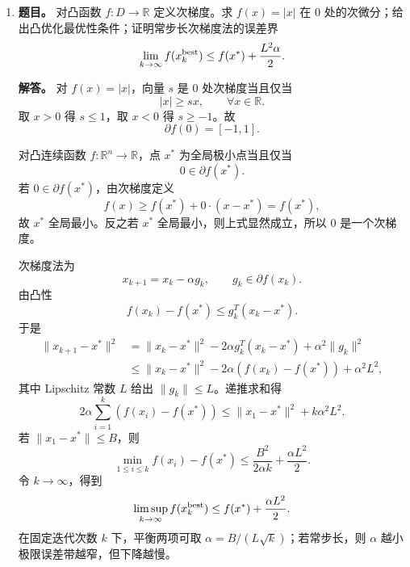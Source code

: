 ﻿\documentclass[UTF8,12pt]{ctexart}
\begin{document}
\begin{enumerate}[label=\textbf{\arabic*.},leftmargin=2.2em]
\item \textbf{题目。} 对凸函数 \(f:D\to\mathbb R\) 定义次梯度。求 \(f(x)=|x|\) 在 \(0\) 处的次微分；给出凸优化最优性条件；证明常步长次梯度法的误差界
\[
\lim_{k\to\infty} f(x_k^{\rm best})\le f(x^\ast)+\frac{L^2\alpha}{2}.
\]

\textbf{解答。} 对 \(f(x)=|x|\)，向量 \(s\) 是 \(0\) 处次梯度当且仅当
\[
|x|\ge sx,\qquad \forall x\in\mathbb R.
\]
取 \(x>0\) 得 \(s\le1\)，取 \(x<0\) 得 \(s\ge-1\)。故
\[
\partial f(0)=[-1,1].
\]

对凸连续函数 \(f:\mathbb R^n\to\mathbb R\)，点 \(x^\ast\) 为全局极小点当且仅当
\[
0\in\partial f(x^\ast).
\]
若 \(0\in\partial f(x^\ast)\)，由次梯度定义
\[
f(x)\ge f(x^\ast)+0\cdot(x-x^\ast)=f(x^\ast),
\]
故 \(x^\ast\) 全局最小。反之若 \(x^\ast\) 全局最小，则上式显然成立，所以 \(0\) 是一个次梯度。

次梯度法为
\[
x_{k+1}=x_k-\alpha g_k,\qquad g_k\in\partial f(x_k).
\]
由凸性
\[
f(x_k)-f(x^\ast)\le g_k^T(x_k-x^\ast).
\]
于是
\[
\begin{aligned}
\|x_{k+1}-x^\ast\|^2
&=\|x_k-x^\ast\|^2-2\alpha g_k^T(x_k-x^\ast)+\alpha^2\|g_k\|^2\\
&\le \|x_k-x^\ast\|^2-2\alpha(f(x_k)-f(x^\ast))+\alpha^2L^2,
\end{aligned}
\]
其中 Lipschitz 常数 \(L\) 给出 \(\|g_k\|\le L\)。递推求和得
\[
2\alpha\sum_{i=1}^k(f(x_i)-f(x^\ast))
\le \|x_1-x^\ast\|^2+k\alpha^2L^2.
\]
若 \(\|x_1-x^\ast\|\le B\)，则
\[
\min_{1\le i\le k} f(x_i)-f(x^\ast)
\le \frac{B^2}{2\alpha k}+\frac{\alpha L^2}{2}.
\]
令 \(k\to\infty\)，得到
\[
\limsup_{k\to\infty}f(x_k^{\rm best})
\le f(x^\ast)+\frac{\alpha L^2}{2}.
\]
在固定迭代次数 \(k\) 下，平衡两项可取 \(\alpha=B/(L\sqrt{k})\)；若常步长，则 \(\alpha\) 越小极限误差带越窄，但下降越慢。
\end{enumerate}
\end{document}
